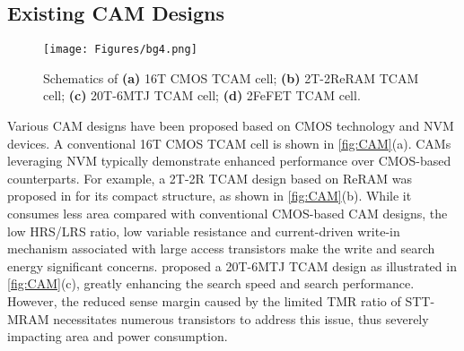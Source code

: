    


   
\subsection{Existing CAM Designs}
\label{sec:existing_work}

\begin{figure}
    \centering
    \texttt{[image: Figures/bg4.png]}
    \caption{Schematics of \textbf{(a)} 16T CMOS TCAM cell; \textbf{(b)} 2T-2ReRAM TCAM cell; \textbf{(c)} 20T-6MTJ TCAM cell; \textbf{(d)} 2FeFET TCAM cell.}
\label{fig:CAM}
\end{figure}




Various CAM designs have been proposed based on CMOS technology and NVM devices. A conventional 16T CMOS TCAM cell is shown in \autoref{fig:CAM}(a). CAMs leveraging NVM typically demonstrate enhanced performance over CMOS-based counterparts. For example, a 2T-2R TCAM design based on ReRAM was proposed in \cite{jing2t2r} for its compact structure, as shown in \autoref{fig:CAM}(b). While it consumes less area compared with conventional CMOS-based CAM designs, %
the low HRS/LRS ratio, low variable resistance and current-driven write-in mechanism associated with large access transistors  make the write and search energy significant concerns. 
\cite{20T6MTJ} proposed a 20T-6MTJ TCAM design as illustrated in \autoref{fig:CAM}(c), greatly enhancing the search speed and search performance. However, the reduced sense margin caused by the limited TMR ratio of STT-MRAM necessitates numerous transistors to address this issue, thus severely impacting area and power consumption.

